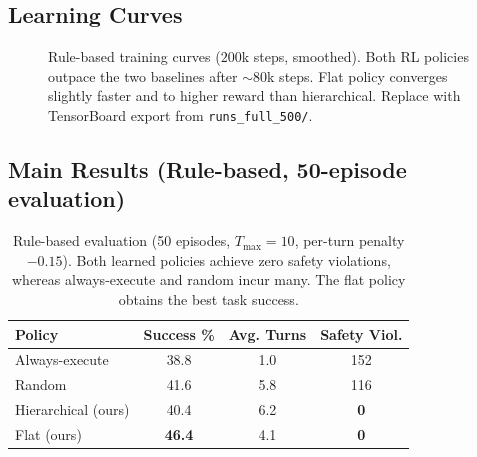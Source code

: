 \subsection{Learning Curves}

\begin{figure}[t]
    \centering
    \caption{Rule-based training curves ($200$k steps, smoothed). Both RL policies outpace the two baselines after $\sim$80k steps. Flat policy converges slightly faster and to higher reward than hierarchical. Replace with TensorBoard export from \texttt{runs\_full\_500/}.}
    \label{fig:learning-curves}
\end{figure}

\subsection{Main Results (Rule-based, 50-episode evaluation)}

\begin{table}[t]
\centering
\small
\begin{tabular}{lccc}
\toprule
\textbf{Policy} & \textbf{Success \%} & \textbf{Avg. Turns} & \textbf{Safety Viol.} \\
\midrule
Always-execute & 38.8 & 1.0 & 152 \\
Random         & 41.6 & 5.8 & 116 \\
Hierarchical (ours) & 40.4 & 6.2 & \textbf{0} \\
Flat (ours)    & \textbf{46.4} & 4.1 & \textbf{0} \\
\bottomrule
\end{tabular}
\caption{Rule-based evaluation (50 episodes, $T_{\max} = 10$, per-turn penalty $-0.15$). Both learned policies achieve zero safety violations, whereas always-execute and random incur many. The flat policy obtains the best task success.}
\label{tab:main-results}
\end{table}

